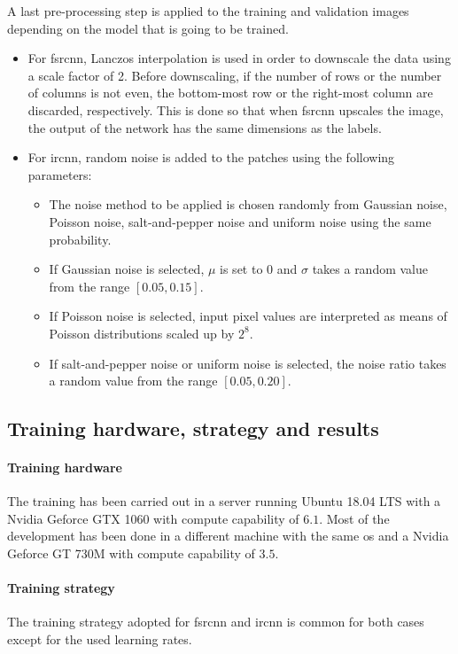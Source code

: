 A last pre-processing step is applied to the training and validation images depending on the model that is going to be trained.
\begin{itemize}
	\item For \gls{fsrcnn}, Lanczos interpolation is used in order to downscale the data using a scale factor of 2. Before downscaling, if the number of rows or the number of columns is not even, the bottom-most row or the right-most column are discarded, respectively. This is done so that when \gls{fsrcnn} upscales the image, the output of the network has the same dimensions as the labels.
	\item For \gls{ircnn}, random noise is added to the patches using the following parameters:
	\begin{itemize}
		\item The noise method to be applied is chosen randomly from Gaussian noise, Poisson noise, salt-and-pepper noise and uniform noise using the same probability.
		\item If Gaussian noise is selected, $\mu$ is set to 0 and $\sigma$ takes a random value from the range $[0.05, 0.15]$.
		\item If Poisson noise is selected, input pixel values are interpreted as means of Poisson distributions scaled up by $2^8$.
		\item If salt-and-pepper noise or uniform noise is selected, the noise ratio takes a random value from the range $[0.05, 0.20]$.
	\end{itemize}
\end{itemize}

\subsection{Training hardware, strategy and results}
\paragraph{Training hardware}
The training has been carried out in a server running Ubuntu 18.04 LTS with a Nvidia Geforce GTX 1060 with compute capability of $6.1$. Most of the development has been done in a different machine with the same \gls{os} and a Nvidia Geforce GT 730M with compute capability of $3.5$.

\paragraph{Training strategy}
The training strategy adopted for \gls{fsrcnn} and \gls{ircnn} is common for both cases except for the used learning rates.

